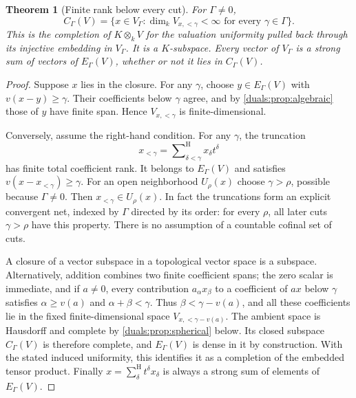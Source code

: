 \documentclass[11pt,letterpaper]{article}
\numberwithin{equation}{section}
\newtheorem{theorem}{Theorem}[section]
\theoremstyle{definition}
\theoremstyle{remark}
\newcommand{\sH}{\mathop{\sum}\nolimits^{\mathrm H}}
\begin{document}
\begin{theorem}[Finite rank below every cut]\label{duals:thm:completion}
For $\Gamma\ne0$,
\begin{equation}\label{duals:eq:completion}
 C_\Gamma(V)=\{x\in V_\Gamma:
             \dim_k V_{x,<\gamma}<\infty\text{ for every }\gamma\in\Gamma\}.
\end{equation}
This is the completion of $K\otimes_kV$ for the valuation uniformity
pulled back through its injective embedding in $V_\Gamma$.
It is a $K$-subspace. Every vector of $V_\Gamma$ is a strong sum of
vectors of $E_\Gamma(V)$, whether or not it lies in $C_\Gamma(V)$.
\end{theorem}
\begin{proof}
Suppose $x$ lies in the closure. For any $\gamma$, choose
$y\in E_\Gamma(V)$ with $v(x-y)\ge\gamma$. Their coefficients below
$\gamma$ agree, and by \cref{duals:prop:algebraic} those of $y$ have finite
span. Hence $V_{x,<\gamma}$ is finite-dimensional.

Conversely, assume the right-hand condition. For any $\gamma$, the
truncation
\[
 x_{<\gamma}=\sH_{\delta<\gamma}x_\delta t^\delta
\]
has finite total coefficient rank. It belongs to $E_\Gamma(V)$ and
satisfies $v(x-x_{<\gamma})\ge\gamma$. For an open neighborhood
$U_\rho(x)$ choose $\gamma>\rho$, possible because $\Gamma\ne0$.
Then $x_{<\gamma}\in U_\rho(x)$. In fact the truncations form an
explicit convergent net, indexed by $\Gamma$ directed by its order:
for every $\rho$, all later cuts $\gamma>\rho$ have this property.
There is no assumption of a countable cofinal set of cuts.

A closure of a vector subspace in a topological vector space is a
subspace. Alternatively, addition combines two finite coefficient spans;
the zero scalar is immediate, and if $a\ne0$, every contribution
$a_\alpha x_\beta$ to a coefficient of $ax$ below $\gamma$ satisfies
$\alpha\ge v(a)$ and $\alpha+\beta<\gamma$. Thus
$\beta<\gamma-v(a)$, and all these coefficients lie in the fixed
finite-dimensional space $V_{x,<\gamma-v(a)}$.
The ambient space is Hausdorff and complete by
\cref{duals:prop:spherical} below. Its closed subspace $C_\Gamma(V)$
is therefore complete, and $E_\Gamma(V)$ is dense in it by construction.
With the stated induced uniformity, this identifies it as a completion
of the embedded tensor product. Finally $x=\sH_\delta t^\delta x_\delta$ is always a strong
sum of elements of $E_\Gamma(V)$.
\end{proof}
\end{document}
